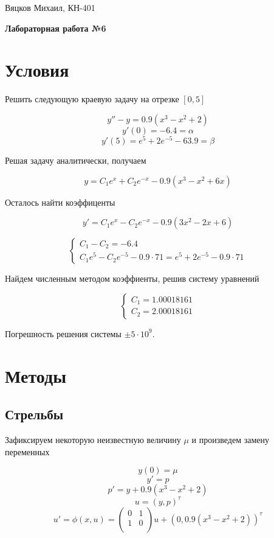\documentclass[11pt,a4paper,oneside]{article}
\begin{document}
\begin{center}
	{Вяцков Михаил, КН-401}
	
	{\huge \bf Лабораторная работа №6}
\end{center}

\section{Условия}

Решить следующую краевую задачу на отрезке $[0, 5]$

$$ y'' - y = 0.9 (x^3 - x^2 + 2) $$
$$ y'(0) = -6.4 = \alpha $$
$$ y'(5) = e^5 + 2e^{-5} - 63.9 = \beta $$

Решая задачу аналитически, получаем

$$ y = C_1 e^x + C_2 e^{-x} - 0.9 (x^3 - x^2 + 6x) $$

Осталось найти коэффиценты

$$ y' = C_1 e^x - C_2 e^{-x} - 0.9 (3 x^2 - 2 x + 6) $$

$$ 
\left\{\begin{matrix}
	C_1 - C_2 = -6.4 \\
	C_1 e^5 - C_2 e^{-5} - 0.9 \cdot 71 = e^5 + 2 e^{-5} - 0.9 \cdot 71
\end{matrix}\right.
$$

Найдем численным методом коэффиенты, решив систему уравнений

$$
\left\{\begin{matrix}
	C_1 = 1.00018161 \\
	C_2 = 2.00018161
\end{matrix}\right.
$$

Погрешность решения системы $\pm 5 \cdot 10^9$.

\section{Методы}

\subsection{Стрельбы}

Зафиксируем некоторую неизвестную величину $\mu$ и произведем замену переменных

$$ y(0) = \mu $$
$$ y' = p $$
$$ p' = y + 0.9 (x^3 - x^2 + 2) $$
$$ u = (y, p)^\tau $$
$$ u' = \phi(x, u) = \left(\begin{matrix}
	0 & 1 \\
	1 & 0 \\
\end{matrix}\right) u + (0, 0.9 (x^3 - x^2 + 2))^\tau $$
\end{document}

